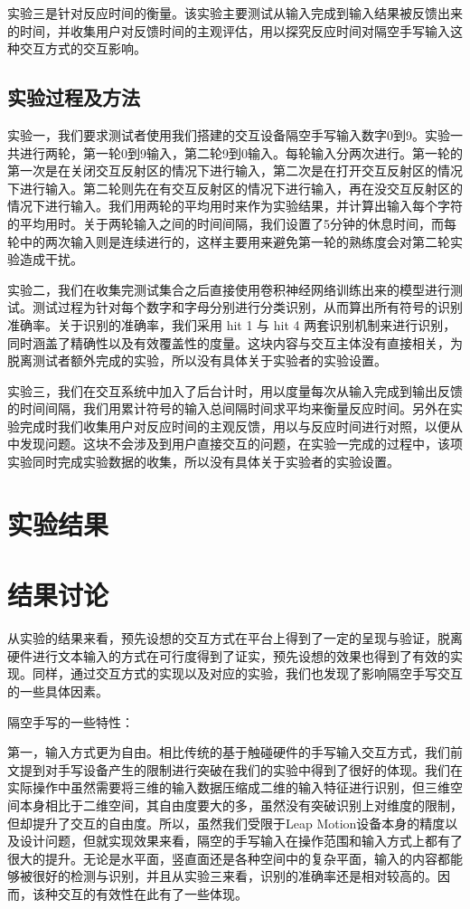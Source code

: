 \documentclass[10pt, twocolumn]{article}
\begin{document}
	实验三是针对反应时间的衡量。该实验主要测试从输入完成到输入结果被反馈出来的时间，并收集用户对反馈时间的主观评估，用以探究反应时间对隔空手写输入这种交互方式的交互影响。

	\subsection{实验过程及方法}

	实验一，我们要求测试者使用我们搭建的交互设备隔空手写输入数字0到9。实验一共进行两轮，第一轮0到9输入，第二轮9到0输入。每轮输入分两次进行。第一轮的第一次是在关闭交互反射区的情况下进行输入，第二次是在打开交互反射区的情况下进行输入。第二轮则先在有交互反射区的情况下进行输入，再在没交互反射区的情况下进行输入。我们用两轮的平均用时来作为实验结果，并计算出输入每个字符的平均用时。关于两轮输入之间的时间间隔，我们设置了5分钟的休息时间，而每轮中的两次输入则是连续进行的，这样主要用来避免第一轮的熟练度会对第二轮实验造成干扰。


	实验二，我们在收集完测试集合之后直接使用卷积神经网络训练出来的模型进行测试。测试过程为针对每个数字和字母分别进行分类识别，从而算出所有符号的识别准确率。关于识别的准确率，我们采用 hit 1 与 hit 4 两套识别机制来进行识别，同时涵盖了精确性以及有效覆盖性的度量。这块内容与交互主体没有直接相关，为脱离测试者额外完成的实验，所以没有具体关于实验者的实验设置。

	实验三，我们在交互系统中加入了后台计时，用以度量每次从输入完成到输出反馈的时间间隔，我们用累计符号的输入总间隔时间求平均来衡量反应时间。另外在实验完成时我们收集用户对反应时间的主观反馈，用以与反应时间进行对照，以便从中发现问题。这块不会涉及到用户直接交互的问题，在实验一完成的过程中，该项实验同时完成实验数据的收集，所以没有具体关于实验者的实验设置。


\section{实验结果}

\section{结果讨论}
从实验的结果来看，预先设想的交互方式在平台上得到了一定的呈现与验证，脱离硬件进行文本输入的方式在可行度得到了证实，预先设想的效果也得到了有效的实现。同样，通过交互方式的实现以及对应的实验，我们也发现了影响隔空手写交互的一些具体因素。

隔空手写的一些特性：

第一，输入方式更为自由。相比传统的基于触碰硬件的手写输入交互方式，我们前文提到对手写设备产生的限制进行突破在我们的实验中得到了很好的体现。我们在实际操作中虽然需要将三维的输入数据压缩成二维的输入特征进行识别，但三维空间本身相比于二维空间，其自由度要大的多，虽然没有突破识别上对维度的限制，但却提升了交互的自由度。所以，虽然我们受限于Leap Motion设备本身的精度以及设计问题，但就实现效果来看，隔空的手写输入在操作范围和输入方式上都有了很大的提升。无论是水平面，竖直面还是各种空间中的复杂平面，输入的内容都能够被很好的检测与识别，并且从实验三来看，识别的准确率还是相对较高的。因而，该种交互的有效性在此有了一些体现。
\end{document}

